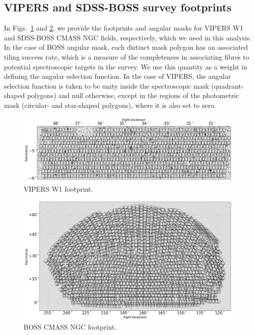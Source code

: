 \documentclass{aa}
\begin{document}
\begin{appendix}
\onecolumn


\section{VIPERS and SDSS-BOSS survey footprints}
\label{sec:appendix_footprints}
%
In Figs.~\ref{fig:vipers_footprint} and \ref{fig:boss_footprint}, we provide the footprints and angular masks for VIPERS W1 and SDSS-BOSS CMASS NGC fields, respectively, which we used in this analysis. In the case of BOSS angular mask, each distinct mask polygon has an associated tiling success rate, which is a measure of the completeness in associating fibres to potential spectroscopic targets in the survey. We use this quantity as a weight in defining the angular selection function. In the case of VIPERS, the angular selection function is taken to be unity inside the spectroscopic mask (quadrant-shaped polygons) and null otherwise, except in the regions of the photometric mask (circular- and star-shaped polygons), where it is also set to zero.

\begin{figure}[h]
\centering
\includegraphics[width=\columnwidth]{Figures/footprint_vipers.png} 
    \caption{VIPERS W1 footprint.}
    \label{fig:vipers_footprint}
\end{figure}
%
\begin{figure}
\centering
\includegraphics[width=\columnwidth]{Figures/footprint_boss.png} 
    \caption{BOSS CMASS NGC footprint.}
    \label{fig:boss_footprint}
\end{figure}
%

\end{appendix}
\end{document}
